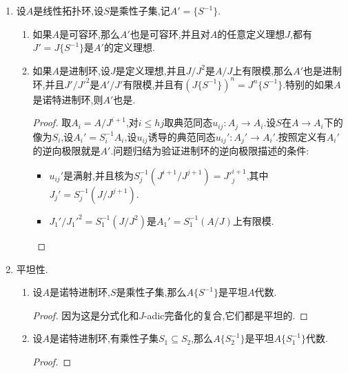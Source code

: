 \begin{enumerate}
\begin{enumerate}[(1)]
\begin{proof}
    		$A\to S^{-1}A$把$A$的和$S$不交的开素理想和$S^{-1}A$的开素理想一一对应;$S^{-1}A\to A\{S^{-1}\}$把$S^{-1}A$的开理想和$A\{S^{-1}\}$的开理想一一对应.
    	\end{proof}
    \end{enumerate}
    \item 设$A$是线性拓扑环,设$S$是乘性子集,记$A'=\{S^{-1}\}$.
    \begin{enumerate}[(1)]
    	\item 如果$A$是可容环,那么$A'$也是可容环,并且对$A$的任意定义理想$J$,都有$J'=J\{S^{-1}\}$是$A'$的定义理想.
    	\item 如果$A$是进制环,设$J$是定义理想,并且$J/J^2$是$A/J$上有限模,那么$A'$也是进制环,并且$J'/{J'}^2$是$A'/J'$有限模,并且有$(J\{S^{-1}\})^n=J^n\{S^{-1}\}$.特别的如果$A$是诺特进制环,则$A'$也是.
    	\begin{proof}
    		
    		取$A_i=A/J^{i+1}$,对$i\le hj$取典范同态$u_{ij}:A_j\to A_i$.设$S$在$A\to A_i$下的像为$S_i$,设$A_i'=S_i^{-1}A_i$,设$u_{ij}$诱导的典范同态$u_{ij}':A_j'\to A_i'$.按照定义有$A_i'$的逆向极限就是$A'$.问题归结为验证进制环的逆向极限描述的条件:
    		\begin{itemize}
    			\item $u_{ij}'$是满射,并且核为$S_j^{-1}(J^{i+1}/J^{j+1})={J'}_j^{i+1}$,其中$J_j'=S_j^{-1}(J/J^{j+1})$.
    			\item $J_1'/{J_1'}^2=S_1^{-1}(J/J^2)$是$A_1'=S_1^{-1}(A/J)$上有限模.
    		\end{itemize}
    	\end{proof}
    \end{enumerate}
    \item 平坦性.
    \begin{enumerate}[(1)]
    	\item 设$A$是诺特进制环,$S$是乘性子集,那么$A\{S^{-1}\}$是平坦$A$代数.
    	\begin{proof}
    		
    		因为这是分式化和$J$-adic完备化的复合,它们都是平坦的.
    	\end{proof}
        \item 设$A$是诺特进制环,有乘性子集$S_1\subseteq S_2$,那么$A\{S_2^{-1}\}$是平坦$A\{S_1^{-1}\}$代数.
        \begin{proof}
        	

\end{proof}
\end{enumerate}
\end{enumerate}
